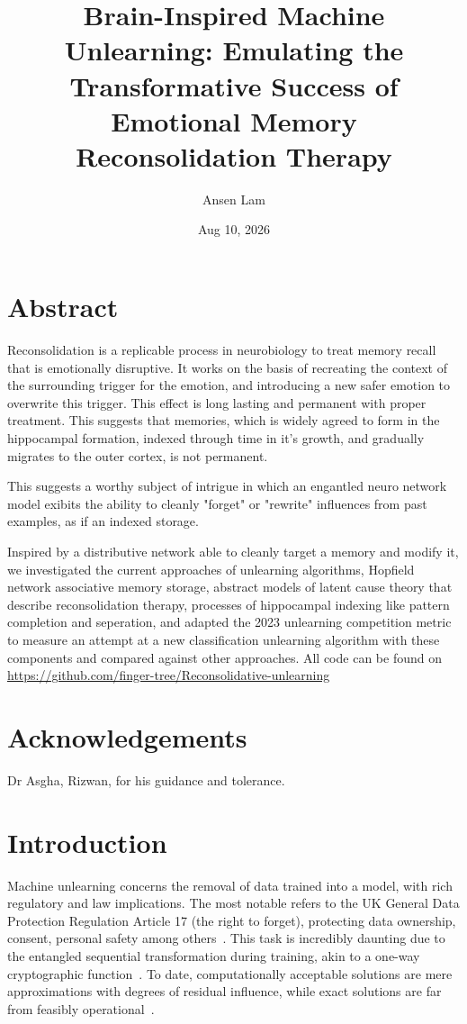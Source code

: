 \documentclass{surreydissertation}
\title{Brain-Inspired Machine Unlearning: Emulating the Transformative Success of Emotional Memory Reconsolidation Therapy}
\author{Ansen Lam}
\date{Aug 10, 2026}
\begin{document}
\maketitle
\tableofcontents

\chapter{Abstract}
Reconsolidation is a replicable process in neurobiology to treat memory recall that is emotionally disruptive. It works on the basis of recreating the context of the surrounding trigger for the emotion, and introducing a new safer emotion to overwrite this trigger. This effect is long lasting and permanent with proper treatment. This suggests that memories, which is widely agreed to form in the hippocampal formation, indexed through time in it's growth, and gradually migrates to the outer cortex, is not permanent.

This suggests a worthy subject of intrigue in which an engantled neuro network model exibits the ability to cleanly "forget" or "rewrite" influences from past examples, as if an indexed storage.

Inspired by a distributive network able to cleanly target a memory and modify it, we investigated the current approaches of unlearning algorithms, Hopfield network associative memory storage, abstract models of latent cause theory that describe reconsolidation therapy, processes of hippocampal indexing like pattern completion and seperation, and adapted the 2023 unlearning competition metric to measure an attempt at a new classification unlearning algorithm with these components and compared against other approaches. All code can be found on \url{https://github.com/finger-tree/Reconsolidative-unlearning}

\chapter*{Acknowledgements}
    Dr Asgha, Rizwan, for his guidance and tolerance.
\chapter{Introduction}
Machine unlearning concerns the removal of data trained into a model, with rich regulatory and law implications. The most notable refers to the UK General Data Protection Regulation Article 17 (the right to forget), protecting data ownership, consent, personal safety among others~\cite{edps2025,liu2024}. This task is incredibly daunting due to the entangled sequential transformation during training, akin to a one-way cryptographic function~\cite{cao2015}. To date, computationally acceptable solutions are mere approximations with degrees of residual influence, while exact solutions are far from feasibly operational~\cite{xu2023,wang2024}.
\end{document}
